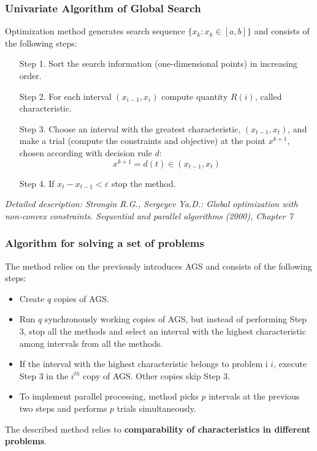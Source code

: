 \documentclass[aspectratio=1610]{beamer}
\begin{document}
\begin{frame}
  \frametitle{Univariate Algorithm of Global Search}
  Optimization method generates search sequence \(\{x_k:x_k\in[a,b]\}\) and consists of the following steps:
  \begin{enumerate}
    \setlength{\itemindent}{.1in}
    \item[Step 1.] Sort the search information (one-dimensional points) in increasing order.
    \item[Step 2.] For each interval \((x_{i-1}, x_i)\) compute quantity \(R(i)\), called characteristic.
    \item[Step 3.] Choose an interval with the greatest characteristic, \((x_{t-1}, x_{t})\), and
    make a trial (compute the constraints and objective) at the point \(x^{k+1}\), chosen according with decision rule \(d\):
    \begin{displaymath}
      x^{k+1}=d(t)\in (x_{t-1}, x_{t})
    \end{displaymath}
    \item[Step 4.] If \(x_{t}-x_{t-1}<\varepsilon\) stop the method.
  \end{enumerate}
  \textit{\footnotesize	{Detailed description: Strongin R.G., Sergeyev Ya.D.: Global optimization with non-convex constraints. Sequential and parallel algorithms (2000), Chapter 7}}
\end{frame}

\begin{frame}
  \frametitle{Algorithm for solving a set of problems}
  The method relies on the previously introduces AGS and consists of the following steps:
  \begin{itemize}
    \item Create \(q\) copies of AGS.
    \item Run \(q\) synchronously working copies of AGS, but instead of performing Step 3, stop all
    the methods and select an interval with the highest characteristic among intervals from all the methods.
    \item If the interval with the highest characteristic belongs to problem i \(i\), execute Step 3 in the \(i^{th}\) copy of AGS.
    Other copies skip Step 3.
    \item To implement parallel processing, method picks \(p\) intervals at the previous two steps
    and performs \(p\) trials simultaneously.
  \end{itemize}
  The described method relies to \textbf{comparability of characteristics in different problems}.
\end{frame}
\end{document}
